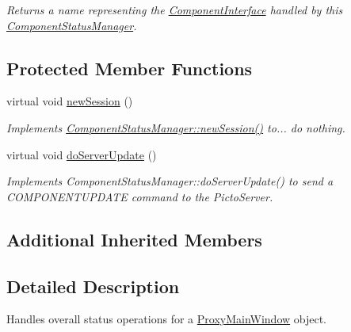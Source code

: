 \begin{DoxyCompactItemize}
\begin{DoxyCompactList}\small\item\em Returns a name representing the \hyperlink{class_component_interface}{Component\-Interface} handled by this \hyperlink{class_component_status_manager}{Component\-Status\-Manager}. \end{DoxyCompactList}\end{DoxyCompactItemize}
\subsection*{Protected Member Functions}
\begin{DoxyCompactItemize}
\item 
\hypertarget{class_proxy_status_manager_a15e5fad493d1861cfd49e4a5d69ab9ad}{virtual void \hyperlink{class_proxy_status_manager_a15e5fad493d1861cfd49e4a5d69ab9ad}{new\-Session} ()}\label{class_proxy_status_manager_a15e5fad493d1861cfd49e4a5d69ab9ad}

\begin{DoxyCompactList}\small\item\em Implements \hyperlink{class_component_status_manager_a1af23b4bf43eac138ca122be16b37b46}{Component\-Status\-Manager\-::new\-Session()} to... do nothing. \end{DoxyCompactList}\item 
\hypertarget{class_proxy_status_manager_a08b1d3111d19c5fa7fddedf9799577da}{virtual void \hyperlink{class_proxy_status_manager_a08b1d3111d19c5fa7fddedf9799577da}{do\-Server\-Update} ()}\label{class_proxy_status_manager_a08b1d3111d19c5fa7fddedf9799577da}

\begin{DoxyCompactList}\small\item\em Implements Component\-Status\-Manager\-::do\-Server\-Update() to send a C\-O\-M\-P\-O\-N\-E\-N\-T\-U\-P\-D\-A\-T\-E command to the Picto\-Server. \end{DoxyCompactList}\end{DoxyCompactItemize}
\subsection*{Additional Inherited Members}


\subsection{Detailed Description}
Handles overall status operations for a \hyperlink{class_proxy_main_window}{Proxy\-Main\-Window} object. 

